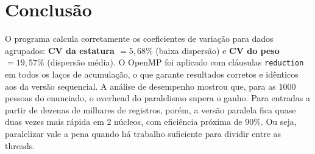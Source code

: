 \documentclass[11pt,a4paper]{article}
\begin{document}
\section{Conclusão}

O programa calcula corretamente os coeficientes de variação para dados agrupados: \textbf{CV da estatura
$= 5{,}68\%$} (baixa dispersão) e \textbf{CV do peso $= 19{,}57\%$} (dispersão média). O OpenMP foi aplicado
com cláusulas \texttt{reduction} em todos os laços de acumulação, o que garante resultados corretos e idênticos
aos da versão sequencial. A análise de desempenho mostrou que, para as 1000 pessoas do enunciado, o overhead
do paralelismo supera o ganho. Para entradas a partir de dezenas de milhares de registros, porém, a versão
paralela fica quase duas vezes mais rápida em 2 núcleos, com eficiência próxima de 90\%. Ou seja, paralelizar
vale a pena quando há trabalho suficiente para dividir entre as threads.
\end{document}
